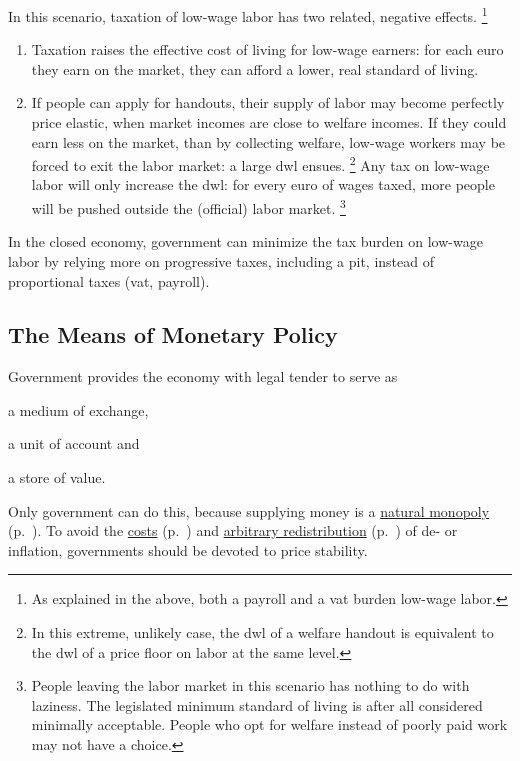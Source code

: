 In this scenario, taxation of low-wage labor has two related, negative effects.
\footnote{
	As explained in the above, both a \gls{payroll} and a \gls{vat} burden low-wage labor.
}

\begin{enumerate}
	\item Taxation raises the effective cost of living for low-wage earners:
	for each euro they earn on the market, they can afford a lower, real standard of living.

	\item If people can apply for handouts, their supply of labor may become perfectly price elastic, when market incomes are close to welfare incomes.
	If they could earn less on the market, than by collecting welfare, low-wage workers may be forced to exit the labor market:
	a large \gls{dwl} ensues.
	\footnote{
		In this extreme, unlikely case, the \gls{dwl} of a welfare handout is equivalent to the \gls{dwl} of a price floor on labor at the same level.
	}
	Any tax on low-wage labor will only increase the \gls{dwl}:
	for every euro of wages taxed, more people will be pushed outside the (official) labor market.
	\footnote{
		People leaving the labor market in this scenario has nothing to do with laziness.
		The legislated minimum standard of living is after all considered minimally acceptable.
		People who opt for welfare instead of poorly paid work may not have a choice.
	}
\end{enumerate}

In the closed economy, government can minimize the tax burden on low-wage labor by relying more on progressive taxes, including a \gls{pit}, instead of proportional taxes (\gls{vat}, \gls{payroll}).


\subsection[Monetary Policy]{The Means of Monetary Policy}
	\label{sec:monetary}
Government provides the economy with legal tender to serve as
\begin{inparaenum}
	\item a medium of exchange,
	\item a unit of account and
	\item a store of value.
\end{inparaenum}

Only government can do this, because supplying money is a \hyperref[sec:natural-monopoly]{natural monopoly} (p.~\pageref{sec:natural-monopoly}).
To avoid the \hyperref[sec:price-stability]{costs} (p.~\pageref{sec:price-stability}) and  \hyperref[sec:distributive-effects-of-inflation]{arbitrary redistribution} (p.~\pageref{sec:distributive-effects-of-inflation}) of de- or inflation,
governments should be devoted to price stability.

